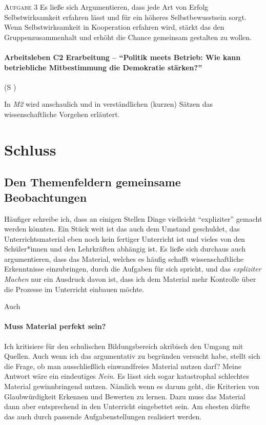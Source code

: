 \textsc{Aufgabe 3} \quad Es ließe sich Argumentieren, dass jede Art von Erfolg Selbstwirksamkeit erfahren lässt und für ein höheres Selbstbewusstsein sorgt. Wenn Selbstwirksamkeit in Kooperation erfahren wird, stärkt das den Gruppenzusammenhalt und erhöht die Chance gemeinsam gestalten zu wollen. 

\paragraph{Arbeitsleben C2 Erarbeitung -- \enquote{Politik meets Betrieb: Wie kann betriebliche Mitbestimmung die Demokratie stärken?}} (\gls{S} \pageref{ARBEITSLEBEN-C2})

In \emph{M2} wird anschaulich und in verständlichen (kurzen) Sätzen das wissenschaftliche Vorgehen erläutert. 






\section{Schluss}
\subsection{Den Themenfeldern gemeinsame Beobachtungen}
Häufiger schreibe ich, dass an einigen Stellen Dinge vielleicht \enquote{expliziter} gemacht werden könnten. Ein Stück weit ist das auch dem Umstand geschuldet, das Unterrichtsmaterial eben noch kein fertiger Unterricht ist und vieles von den Schüler*innen und den Lehrkräften abhängig ist. Es ließe sich durchaus auch argumentieren, dass das Material, welches es häufig schafft wissenschaftliche Erkenntnisse einzubringen, durch die Aufgaben für sich spricht, und das \emph{expliziter Machen} nur ein Ausdruck davon ist, dass ich dem Material mehr Kontrolle über die Prozesse im Unterricht einbauen möchte. 
\bigskip

Auch 



\paragraph{Muss Material perfekt sein?} 
Ich kritisiere für den schulischen Bildungsbereich akribisch den Umgang mit Quellen. Auch wenn ich das argumentativ zu begründen versucht habe, stellt sich die Frage, ob man ausschließlich einwandfreies Material nutzen darf?
Meine Antwort wäre ein eindeutiges \emph{Nein}. Es lässt sich sogar katastrophal schlechtes Material gewinnbringend nutzen. Nämlich wenn es darum geht, die Kriterien von Glaubwürdigkeit Erkennen und Bewerten zu lernen. Dazu muss das Material dann aber entsprechend in den Unterricht eingebettet sein. Am ehesten dürfte das auch durch passende Aufgabenstellungen realisiert werden. 

